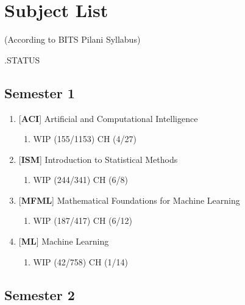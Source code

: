 \chapter*{Subject List}

\begin{center}
(According to BITS Pilani Syllabus)
\end{center}

.\hfill STATUS

\section*{Semester 1}
\begin{enumerate}[series=sublist]
    \item {[\textbf{ACI}]} Artificial and Computational Intelligence
        \begin{enumerate}
            \item {}
            \hfill WIP (155/1153) CH (4/27)
        \end{enumerate}

    \item {[\textbf{ISM}]} Introduction to Statistical Methods
        \begin{enumerate}
            \item {}
            \hfill WIP (244/341) CH (6/8)
        \end{enumerate}

    \item {[\textbf{MFML}]} Mathematical Foundations for Machine Learning
        \begin{enumerate}
            \item {}
            \hfill WIP (187/417) CH (6/12)
        \end{enumerate}

    \item {[\textbf{ML}]} Machine Learning
        \begin{enumerate}
            \item {}
            \hfill WIP (42/758) CH (1/14)
        \end{enumerate}
\end{enumerate}


\section*{Semester 2}

